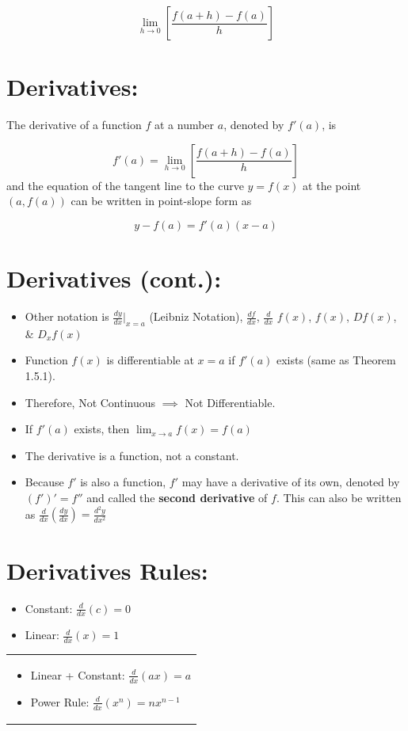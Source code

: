 \documentclass[12pt]{article}
\begin{document}
$$\lim_{h \to 0} \left [ \frac{f(a+h)-f(a)}{h} \right ]$$

\section{Derivatives:} The derivative of a function $f$ at a number $a$, denoted by $f'(a)$, is 

$$f'(a) = \lim_{h \to 0} \left [ \frac{f(a+h)-f(a)}{h} \right ]$$
and the equation of the tangent line to the curve $y=f(x)$ at the point $(a,f(a))$ can be written in point-slope form as

$$y-f(a)=f'(a)(x-a)$$

\section{Derivatives (cont.):}
\begin{itemize}
    \item Other notation is $\frac{d y}{d x} |_{x=a}$ (Leibniz Notation),  $\frac{d f}{d x}$, $\frac{d}{d x}$ $f(x)$, $f(x)$, $D f(x)$, \& $D_{x} f(x)$
    \item Function $f(x)$ is differentiable at $x=a$ if $f'(a)$ exists (same as Theorem 1.5.1).
    \item Therefore, Not Continuous $\implies$ Not Differentiable.
    \item If $f'(a)$ exists, then $\lim_{x \to a} f(x) = f(a)$
    \item The derivative is a function, not a constant.
    \item Because $f'$ is also a function, $f'$ may have a derivative of its own, denoted by $(f')' = f''$ and called the \textbf{second derivative} of $f$. This can also be written as $\frac{d}{d x} \left ( \frac{d y}{d x} \right ) = \frac{d^2 y}{dx^2}$
\end{itemize}


\section{Derivatives Rules:}

\begin{minipage}{0.5\textwidth}

\begin{itemize}
    \item Constant: $\frac{d}{d x}(c) = 0$
    \item Linear: $\frac{d}{d x}(x) = 1$
\end{itemize}

\end{minipage}
\begin{minipage}{0.45\textwidth}
\begin{tabular}{|p{\textwidth}}
\begin{itemize}
    \item Linear + Constant: $\frac{d}{d x}(ax) = a$
    \item Power Rule: $\frac{d}{d x}(x^n) = n x^{n-1}$
\end{itemize}
\end{tabular}
\end{minipage}
\end{document}
